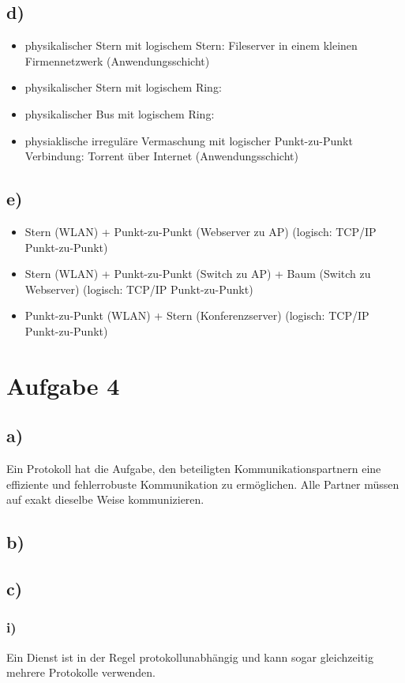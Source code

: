 \documentclass[a4paper,12pt]{scrartcl}
\begin{document}
\subsection{d)}
\begin{itemize}
	\item physikalischer Stern mit logischem Stern: Fileserver in einem
	kleinen Firmennetzwerk (Anwendungsschicht)
	\item physikalischer Stern mit logischem Ring:
	\item physikalischer Bus mit logischem Ring: 
	\item physiaklische irreguläre Vermaschung mit logischer Punkt-zu-Punkt Verbindung: Torrent über Internet (Anwendungsschicht)	
\end{itemize}

\subsection{e)}
\begin{itemize}
	\item Stern (WLAN) + Punkt-zu-Punkt (Webserver zu AP) (logisch: TCP/IP Punkt-zu-Punkt)
	\item Stern (WLAN) + Punkt-zu-Punkt (Switch zu AP) + Baum (Switch zu Webserver) (logisch: TCP/IP Punkt-zu-Punkt)
	\item Punkt-zu-Punkt (WLAN) + Stern (Konferenzserver) (logisch: TCP/IP Punkt-zu-Punkt)
\end{itemize}

\section{Aufgabe 4}
\subsection{a)}
Ein Protokoll hat die Aufgabe, den beteiligten Kommunikationspartnern eine
effiziente und fehlerrobuste Kommunikation zu ermöglichen. Alle Partner müssen
auf exakt dieselbe Weise kommunizieren.

\subsection{b)}

\subsection{c)}
\subsubsection{i)}
Ein Dienst ist in der Regel protokollunabhängig und kann sogar gleichzeitig
mehrere Protokolle verwenden.
\end{document}
